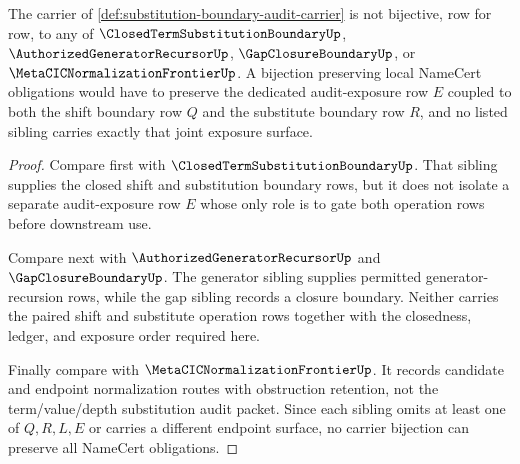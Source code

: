 \begin{theorem}
\label{thm:substitution-boundary-audit-independence-witness}
The carrier of \autoref{def:substitution-boundary-audit-carrier} is not bijective, row for row, to any of $\ClosedTermSubstitutionBoundaryUp$, $\AuthorizedGeneratorRecursorUp$, $\GapClosureBoundaryUp$, or $\MetaCICNormalizationFrontierUp$. A bijection preserving local NameCert obligations would have to preserve the dedicated audit-exposure row $E$ coupled to both the shift boundary row $Q$ and the substitute boundary row $R$, and no listed sibling carries exactly that joint exposure surface.
\end{theorem}
\begin{proof}
Compare first with $\ClosedTermSubstitutionBoundaryUp$. That sibling supplies the closed shift and substitution boundary rows, but it does not isolate a separate audit-exposure row $E$ whose only role is to gate both operation rows before downstream use.

Compare next with $\AuthorizedGeneratorRecursorUp$ and $\GapClosureBoundaryUp$. The generator sibling supplies permitted generator-recursion rows, while the gap sibling records a closure boundary. Neither carries the paired shift and substitute operation rows together with the closedness, ledger, and exposure order required here.

Finally compare with $\MetaCICNormalizationFrontierUp$. It records candidate and endpoint normalization routes with obstruction retention, not the term/value/depth substitution audit packet. Since each sibling omits at least one of $Q,R,L,E$ or carries a different endpoint surface, no carrier bijection can preserve all NameCert obligations.
\end{proof}



